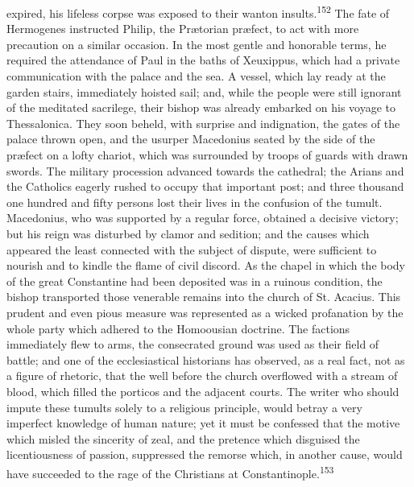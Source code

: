 expired, his lifeless corpse was exposed to their wanton insults.\textsuperscript{152}
The fate of Hermogenes instructed Philip, the Prætorian
præfect, to act with more precaution on a similar occasion. In
the most gentle and honorable terms, he required the attendance
of Paul in the baths of Xeuxippus, which had a private
communication with the palace and the sea. A vessel, which lay
ready at the garden stairs, immediately hoisted sail; and, while
the people were still ignorant of the meditated sacrilege, their
bishop was already embarked on his voyage to Thessalonica. They
soon beheld, with surprise and indignation, the gates of the
palace thrown open, and the usurper Macedonius seated by the side
of the præfect on a lofty chariot, which was surrounded by troops
of guards with drawn swords. The military procession advanced
towards the cathedral; the Arians and the Catholics eagerly
rushed to occupy that important post; and three thousand one
hundred and fifty persons lost their lives in the confusion of
the tumult. Macedonius, who was supported by a regular force,
obtained a decisive victory; but his reign was disturbed by
clamor and sedition; and the causes which appeared the least
connected with the subject of dispute, were sufficient to nourish
and to kindle the flame of civil discord. As the chapel in which
the body of the great Constantine had been deposited was in a
ruinous condition, the bishop transported those venerable remains
into the church of St. Acacius. This prudent and even pious
measure was represented as a wicked profanation by the whole
party which adhered to the Homoousian doctrine. The factions
immediately flew to arms, the consecrated ground was used as
their field of battle; and one of the ecclesiastical historians
has observed, as a real fact, not as a figure of rhetoric, that
the well before the church overflowed with a stream of blood,
which filled the porticos and the adjacent courts. The writer who
should impute these tumults solely to a religious principle,
would betray a very imperfect knowledge of human nature; yet it
must be confessed that the motive which misled the sincerity of
zeal, and the pretence which disguised the licentiousness of
passion, suppressed the remorse which, in another cause, would
have succeeded to the rage of the Christians at Constantinople.\textsuperscript{153}


